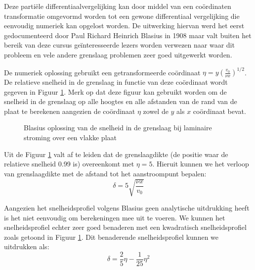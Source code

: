 Deze partiële differentiaalvergelijking kan door middel van een coördinaten transformatie omgevormd worden tot een gewone differentiaal vergelijking die eenvoudig numeriek kan opgelost worden. De uitwerking hiervan werd het eerst gedocumenteerd door Paul Richard Heinrich Blasius in 1908 maar valt buiten het bereik van deze cursus geïnteresseerde lezers worden verwezen naar \cite{Schlichting1979} waar dit probleem en vele andere grenslaag problemen zeer goed uitgewerkt worden.

De numeriek oplossing gebruikt een getransformeerde coördinaat $\eta = y (\frac{v_0}{\nu x})^{1/2}$. De relatieve snelheid in de grenslaag in functie van deze coördinaat wordt gegeven in Figuur  \ref{fig:Grenslaagsnelheid}. Merk op dat deze figuur kan gebruikt worden om de snelheid in de grenslaag op alle hoogtes en alle afstanden van de rand van de plaat te berekenen aangezien de coördinaat $\eta$ zowel de $y$ als $x$ coördinaat bevat.
\begin{figure}[htb]
	\centering
	\caption{Blasius oplossing van de snelheid in de grenslaag bij laminaire stroming over een vlakke plaat}
	\label{fig:Grenslaagsnelheid}
\end{figure}

Uit de Figuur \ref{fig:Grenslaagsnelheid} valt af te leiden dat de grenslaagdikte (de positie waar de relatieve snelheid 0.99 is) overeenkomt met $\eta = 5$. Hieruit kunnen we het verloop van grenslaagdikte met de afstand tot het aanstroompunt bepalen:
\begin{equation}
	\delta = 5 \sqrt{\frac{\nu x}{v_0}}
\end{equation}

Aangezien het snelheidsprofiel volgens Blasius geen analytische uitdrukking heeft is het niet eenvoudig om berekeningen mee uit te voeren. We kunnen het snelheidsprofiel echter zeer goed benaderen met een kwadratisch snelheidsprofiel zoals getoond in Figuur \ref{fig:Grenslaagsnelheid}. Dit benaderende snelheidsprofiel kunnen we uitdrukken als:
\begin{equation}
	\delta = \frac{2}{5}\eta - \frac{1}{25}\eta^2
\end{equation}

